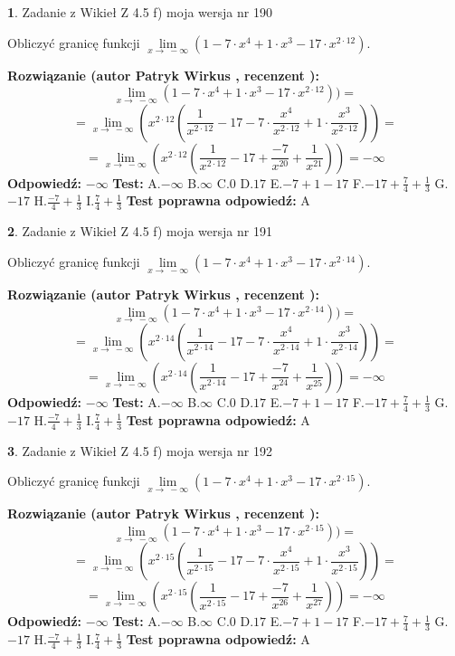 \documentclass[12pt, a4paper]{article}
\theoremstyle{definition} %
\newtheorem{zad}{}
\newcommand{\zadStart}[1]{\begin{zad}#1\newline}
\newcommand{\zadStop}{\end{zad}}
\newcommand{\rozwStart}[2]{\noindent \textbf{Rozwiązanie (autor #1 , recenzent #2): }\newline}
\newcommand{\rozwStop}{\newline}
\newcommand{\odpStart}{\noindent \textbf{Odpowiedź:}\newline}
\newcommand{\odpStop}{\newline}
\newcommand{\testStart}{\noindent \textbf{Test:}\newline}
\newcommand{\testStop}{\newline}
\newcommand{\kluczStart}{\noindent \textbf{Test poprawna odpowiedź:}\newline}
\newcommand{\kluczStop}{\newline}
\begin{document}
\zadStart{Zadanie z Wikieł Z 4.5 f) moja wersja nr 190}



Obliczyć granicę funkcji  $\lim\limits_{x\to\ -\infty}(1 - 7 \cdot x^{4}+1 \cdot x^{3}- 17 \cdot x^{2\cdot12})$.
\zadStop
\rozwStart{Patryk Wirkus}{}
$$\lim\limits_{x\to\ -\infty}(1 - 7 \cdot x^{4}+1 \cdot x^{3}- 17 \cdot x^{2\cdot12}))=$$
$$=\lim\limits_{x\to\ -\infty}(x^{2\cdot12}(\frac{1}{x^{2\cdot12}}-17 -7 \cdot \frac{x^{4}}{x^{2\cdot12}}+1 \cdot \frac{x^{3}}{x^{2\cdot12}}))=$$
$$=\lim\limits_{x\to\ -\infty}(x^{2\cdot12}(\frac{1}{x^{2\cdot12}}-17 + \frac{-7}{x^{20}}+ \frac{1}{x^{21}}))=-\infty$$
\rozwStop
\odpStart
$-\infty$
\odpStop
\testStart
A.$-\infty$ B.$\infty$ C.$0$ D.$17$ E.$-7 + 1 - 17$
F.$-17+\frac{7}{4}+\frac{1}{3}$ G.$-17$
H.$\frac{-7}{4}+\frac{1}{3}$
I.$\frac{7}{4}+\frac{1}{3}$
\testStop
\kluczStart
A
\kluczStop



\zadStart{Zadanie z Wikieł Z 4.5 f) moja wersja nr 191}



Obliczyć granicę funkcji  $\lim\limits_{x\to\ -\infty}(1 - 7 \cdot x^{4}+1 \cdot x^{3}- 17 \cdot x^{2\cdot14})$.
\zadStop
\rozwStart{Patryk Wirkus}{}
$$\lim\limits_{x\to\ -\infty}(1 - 7 \cdot x^{4}+1 \cdot x^{3}- 17 \cdot x^{2\cdot14}))=$$
$$=\lim\limits_{x\to\ -\infty}(x^{2\cdot14}(\frac{1}{x^{2\cdot14}}-17 -7 \cdot \frac{x^{4}}{x^{2\cdot14}}+1 \cdot \frac{x^{3}}{x^{2\cdot14}}))=$$
$$=\lim\limits_{x\to\ -\infty}(x^{2\cdot14}(\frac{1}{x^{2\cdot14}}-17 + \frac{-7}{x^{24}}+ \frac{1}{x^{25}}))=-\infty$$
\rozwStop
\odpStart
$-\infty$
\odpStop
\testStart
A.$-\infty$ B.$\infty$ C.$0$ D.$17$ E.$-7 + 1 - 17$
F.$-17+\frac{7}{4}+\frac{1}{3}$ G.$-17$
H.$\frac{-7}{4}+\frac{1}{3}$
I.$\frac{7}{4}+\frac{1}{3}$
\testStop
\kluczStart
A
\kluczStop



\zadStart{Zadanie z Wikieł Z 4.5 f) moja wersja nr 192}



Obliczyć granicę funkcji  $\lim\limits_{x\to\ -\infty}(1 - 7 \cdot x^{4}+1 \cdot x^{3}- 17 \cdot x^{2\cdot15})$.
\zadStop
\rozwStart{Patryk Wirkus}{}
$$\lim\limits_{x\to\ -\infty}(1 - 7 \cdot x^{4}+1 \cdot x^{3}- 17 \cdot x^{2\cdot15}))=$$
$$=\lim\limits_{x\to\ -\infty}(x^{2\cdot15}(\frac{1}{x^{2\cdot15}}-17 -7 \cdot \frac{x^{4}}{x^{2\cdot15}}+1 \cdot \frac{x^{3}}{x^{2\cdot15}}))=$$
$$=\lim\limits_{x\to\ -\infty}(x^{2\cdot15}(\frac{1}{x^{2\cdot15}}-17 + \frac{-7}{x^{26}}+ \frac{1}{x^{27}}))=-\infty$$
\rozwStop
\odpStart
$-\infty$
\odpStop
\testStart
A.$-\infty$ B.$\infty$ C.$0$ D.$17$ E.$-7 + 1 - 17$
F.$-17+\frac{7}{4}+\frac{1}{3}$ G.$-17$
H.$\frac{-7}{4}+\frac{1}{3}$
I.$\frac{7}{4}+\frac{1}{3}$
\testStop
\kluczStart
A
\kluczStop
\end{document}
